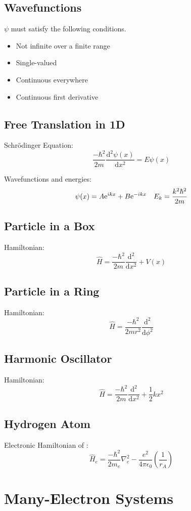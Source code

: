 \subsection*{Wavefunctions}
$\psi$ must satisfy the following conditions.
\begin{itemize}
    \item Not infinite over a finite range
    \item Single-valued
    \item Continuous everywhere
    \item Continuous first derivative
\end{itemize}

\subsection*{Free Translation in 1D}
Schrödinger Equation:
$$\frac{-\hbar^2}{2m} \frac{\mathrm{d}^2\psi(x)}{\mathrm{d}x^2} =  E \psi(x)$$

Wavefunctions and energies:
$$\psi(x) = A {\rm e}^{ikx} + B {\rm e}^{-ikx} \quad E_k = \frac{k^2\hbar^2}{2m}$$


\subsection*{Particle in a Box}
Hamiltonian:
$$\hat{H} = \frac{-\hbar^2}{2m} \frac{\mathrm{d}^2}{\mathrm{d}x^2} + V(x)$$

\subsection*{Particle in a Ring}
Hamiltonian:
$$\hat{H} = \frac{-\hbar^2}{2mr^2} \frac{\mathrm{d}^2}{\mathrm{d}\phi^2}$$

\subsection*{Harmonic Oscillator}
Hamiltonian:
$$\hat{H} = \frac{-\hbar^2}{2m} \frac{\mathrm{d}^2}{\mathrm{d}x^2} + \frac{1}{2}kx^2$$

\subsection*{Hydrogen Atom}
Electronic Hamiltonian of :
$$\hat{H}_e = \frac{-\hbar^2}{2m_e}\nabla_e^2-\frac{e^2}{4\pi\epsilon_0} \left( \frac{1}{r_A} \right)$$

\section{Many-Electron Systems}
